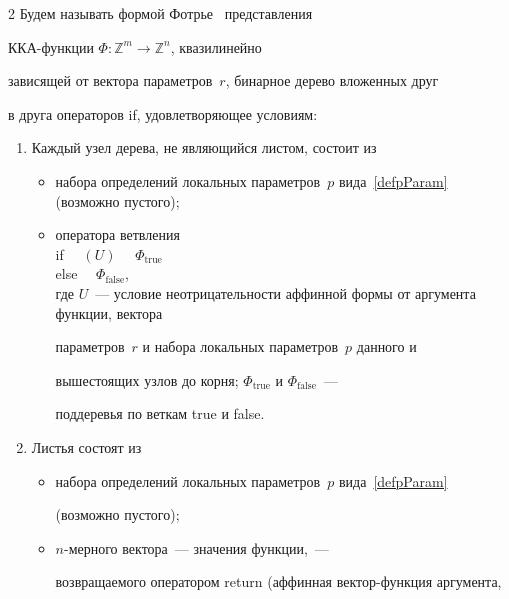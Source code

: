 \begin{multicols}{2}
Будем называть формой Фотрье~\cite{Feautrier2} представления

ККА-функции $\Phi:\mathbb{Z}^m\to\mathbb{Z}^n$, квазилинейно

зависящей от вектора параметров~$r$, бинарное дерево вложенных друг

в друга операторов if, удовлетворяющее условиям:

\begin{enumerate}

\item Каждый узел дерева, не являющийся листом, состоит из

    \begin{itemize}

    \item набора определений локальных па\-ра\-мет\-ров~$p$ вида~\eqref{defpParam} (возможно пустого);

    \item оператора ветвления \\

    if \ \ $(U)$ \ \  $\Phi_{\mathrm{true}}$\\

    else \ \  $\Phi_{\mathrm{false}}$,\\

    где $U$~--- условие неотрицательности аффинной формы от аргумента функции, вектора 

    па\-ра\-мет\-ров~$r$ и набора локальных па\-ра\-мет\-ров~$p$ данного и 

    вышестоящих узлов до корня; $\Phi_{\mathrm{true}}$ и $\Phi_{\mathrm{false}}$~--- 

    поддеревья по веткам true и false.\\[-15pt]

    \end{itemize}

\item Листья состоят из

    \begin{itemize}

    \item набора определений локальных па\-ра\-мет\-ров~$p$ вида~\eqref{defpParam} 

    (возможно пус\-то\-го);\\[-15pt]

    \item $n$-мер\-но\-го вектора~--- значения функции,~--- 

    возвращаемого оператором return (аффинная век\-тор\--функ\-ция аргумента,  


\end{itemize}
\end{enumerate}
\end{multicols}
